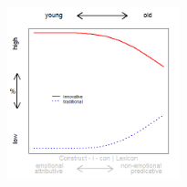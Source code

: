 \documentclass[12pt, table]{beamer}
\begin{document}
\begin{frame}
\begin{minipage}[t]{\linewidth}
\begin{minipage}{.45\linewidth}
\begin{tabular}{cccccccccc }
\end{tabular}
\end{minipage}
\hfill
\begin{minipage}{.45\linewidth}
\begin{figure}
\includegraphics[width=5cm]{images/LangChang16.png}
\end{figure}
\end{minipage}
\end{minipage}
\end{frame}
\end{document}
